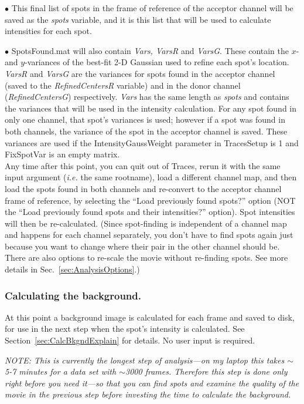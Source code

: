 \documentclass[11pt]{article}
\begin{document}
$\bullet$ This final list of spots in the frame of reference of the acceptor channel will be saved as the {\it spots} variable, and it is this list that will be used to calculate intensities for each spot.

$\bullet$ SpotsFound.mat will also contain {\it Vars, VarsR} and {\it VarsG}.  These contain the $x$- and $y$-variances of the best-fit 2-D Gaussian used to refine each spot's location.  {\it VarsR} and {\it VarsG} are the variances for spots found in the acceptor channel (saved to the {\it RefinedCentersR} variable) and in the donor channel ({\it RefinedCentersG}) respectively. {\it Vars} has the same length as {\it spots} and contains the variances that will be used in the intensity calculation.  For any spot found in only one channel, that spot's variances is used; however if a spot was found in both channels, the variance of the spot in the acceptor channel is saved.  These variances are used if the IntensityGaussWeight parameter in TracesSetup is 1 and FixSpotVar is an empty matrix.\\

\noindent Any time after this point, you can quit out of Traces, rerun it with the same input argument ({\it i.e.} the same rootname), load a different channel map, and then load the spots found in both channels and re-convert to the acceptor channel frame of reference, by selecting the ``Load previously found spots?'' option (NOT the ``Load previously found spots and their intensities?'' option).  Spot intensities will then be re-calculated. (Since spot-finding is independent of a channel map and happens for each channel separately, you don't have to find spots again just because you want to change where their pair in the other channel should be.  There are also options to re-scale the movie without re-finding spots.  See more details in Sec.~\ref{sec:AnalysisOptions}.)\\

\subsubsection{Calculating the background.}\label{sec:BkgndSub}

At this point a background image is calculated for each frame and saved to disk, for use in the next step when the spot's intensity is calculated. See Section~\ref{sec:CalcBkgndExplain} for details. No user input is required.

{\it NOTE: This is currently the longest step of analysis---on my laptop this takes $\sim$5-7 minutes for a data set with $\sim$3000 frames.  Therefore this step is done only right before you need it---so that you can find spots and examine the quality of the movie in the previous step before investing the time to calculate the background.}
\end{document}
